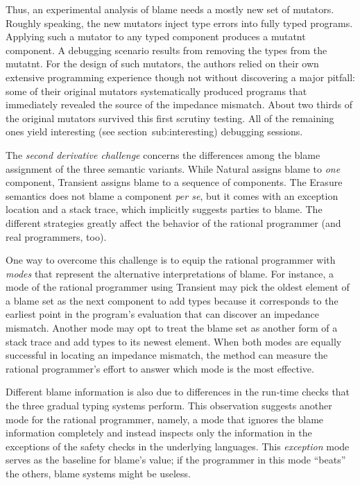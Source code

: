 Thus, an experimental analysis of blame needs a mostly new set of mutators.
Roughly speaking, the new mutators inject type errors into fully typed programs.
Applying such a mutator to any typed component produces a mutatnt component.  A
debugging scenario results from removing the types from the mutatnt. For the
design of such mutators, the authors relied on their own extensive programming
experience though not without discovering a major pitfall: some of their
original mutators systematically produced programs that immediately revealed the
source of the impedance mismatch. About two thirds of the original mutators
survived this first scrutiny testing. All of the remaining ones yield
interesting (see section~{sub:interesting}) debugging sessions.

The {\em second derivative challenge\/} concerns the differences among the blame
assignment of the three semantic variants.  While Natural assigns blame to {\em
one\/} component, Transient assigns blame to a sequence of components. The
Erasure semantics does not blame a component {\it per se\/}, but it comes with
an exception location and a stack trace, which implicitly suggests parties to
blame.  The different strategies greatly affect the behavior of the rational
programmer (and real programmers, too).

One way to overcome this challenge is to equip the rational programmer with
\emph{modes} that represent the alternative interpretations of blame.  For
instance, a mode of the rational programmer using Transient may pick the oldest
element of a blame set as the next component to add types because it corresponds
to the earliest point in the program's evaluation that can discover an impedance
mismatch.  Another mode may opt to treat the blame set as another form of a
stack trace and add types to its newest element.  When both modes are equally
successful in locating an impedance mismatch, the method can measure the
rational programmer's effort to answer which mode is the most effective.

Different blame information is also due to differences in the run-time checks
that the three gradual typing systems perform. This observation suggests another
mode for the rational programmer, namely, a mode that ignores the blame
information completely and instead inspects only the information in the
exceptions of the safety checks in the underlying languages.  This
\emph{exception} mode serves as the baseline for blame's value; if the
programmer in this mode ``beats'' the others, blame systems might be useless. 


